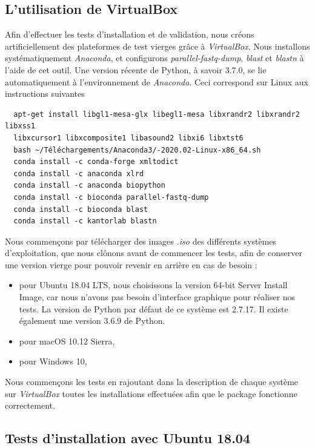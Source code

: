 \documentclass[twoside,a4paper,11pt,frenchb,openany]{report}
\begin{document}
\subsection{L'utilisation de VirtualBox}

Afin d'effectuer les tests d'installation et de validation, nous créons artificiellement des plateformes de test vierges grâce à \textit{VirtualBox}. Nous installons systématiquement \textit{Anaconda}, et configurons \textit{parallel-fastq-dump}, \textit{blast} et \textit{blastn} à l'aide de cet outil. Une version récente de Python, à savoir 3.7.0, se lie automatiquement à l'environnement de \textit{Anaconda}. Ceci correspond sur Linux aux instructions suivantes

\begin{verbatim}
  apt-get install libgl1-mesa-glx libegl1-mesa libxrandr2 libxrandr2 libxss1 
  libxcursor1 libxcomposite1 libasound2 libxi6 libxtst6
  bash ~/Téléchargements/Anaconda3/-2020.02-Linux-x86_64.sh
  conda install -c conda-forge xmltodict
  conda install -c anaconda xlrd
  conda install -c anaconda biopython
  conda install -c bioconda parallel-fastq-dump
  conda install -c bioconda blast
  conda install -c kantorlab blastn
\end{verbatim}

Nous commençons par télécharger des images \textit{.iso} des différents systèmes d'exploitation, que nous clônons avant de commencer les tests, afin de conserver une version vierge pour pouvoir revenir en arrière en cas de besoin :
\begin{itemize}
\item pour Ubuntu 18.04 LTS, nous choisissons la version 64-bit Server Install Image, car nous n'avons pas besoin d'interface graphique pour réaliser nos tests. La version de Python par défaut de ce système est 2.7.17. Il existe également une version 3.6.9 de Python.
\item pour macOS 10.12 Sierra, 
\item pour Windows 10, 
\end{itemize}

Nous commençons les tests en rajoutant dans la description de chaque système sur \textit{VirtualBox} toutes les installations effectuées afin que le package fonctionne correctement.





\subsection{Tests d'installation avec Ubuntu 18.04}
\end{document}
